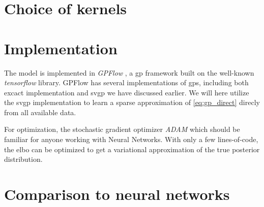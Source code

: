 \section{Choice of kernels}

\section{Implementation}
The model is implemented in \textit{GPFlow} \cite{GPflow2017}, a \acrshort{gp} framework built on the well-known \textit{tensorflow} \cite{tensorflow2015-whitepaper} library. GPFlow has several implementations of \acrshort{gp}s, including both excact implementation and \acrshort{svgp} we have discussed earlier. We will here utilize the \acrshort{svgp} implementation to learn a sparse approximation of \cref{eq:gp_direct} direcly from all available data. 

For optimization, the stochastic gradient optimizer \textit{ADAM} which should be familiar for anyone working with Neural Networks. With only a few lines-of-code, the \acrshort{elbo} can be optimized to get a variational approximation of the true posterior distribution.

\section{Comparison to neural networks}



